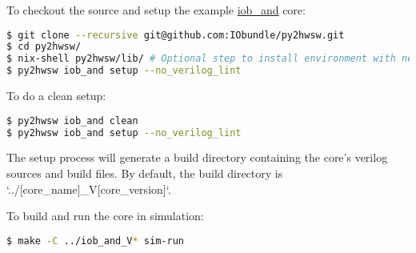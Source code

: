 %

To checkout the source and setup the example \href{https://github.com/IObundle/py2hwsw/tree/main/py2hwsw/lib/hardware/basic_tests/iob_and}{iob\_and} core:

\begin{lstlisting}[language=bash]
$ git clone --recursive git@github.com:IObundle/py2hwsw.git
$ cd py2hwsw/
$ nix-shell py2hwsw/lib/ # Optional step to install environment with necessary dependencies
$ py2hwsw iob_and setup --no_verilog_lint
\end{lstlisting}

To do a clean setup:

\begin{lstlisting}[language=bash]
$ py2hwsw iob_and clean
$ py2hwsw iob_and setup --no_verilog_lint
\end{lstlisting}

The setup process will generate a build directory containing the core's verilog sources and build files.
By default, the build directory is `../[core\_name]\_V[core\_version]`.

To build and run the core in simulation:
\begin{lstlisting}[language=bash]
$ make -C ../iob_and_V* sim-run
\end{lstlisting}
